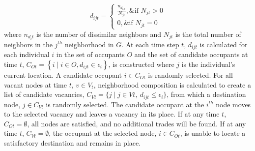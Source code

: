 \documentclass[a4paper]{article}
\begin{document}
\begin{equation}
    d_{ijt} = 
    \begin{cases} 
    \frac{n_{d_{i,t}}}{N_{jt}}, \& \text{if } N_{jt} > 0 \\
    0, \& \text{if } N_{jt} = 0 
    \end{cases}
\end{equation}
where $n_{d_it}$ is the number of dissimilar neighbors and $N_{jt}$ is the total number of neighbors in the $j^{th}$ neighborhood in $G$.  At each time step $t$, $d_{ijt}$ is calculated for each individual $i$ in the set of occupants $O$ and the set of candidate occupants at time $t$,  $C_{Ot} = \left\{ i \mid i \in O, d_{ijt} \in \epsilon_i \right\}
$, is constructed where $j$ is the individual’s current location. A candidate occupant $i\in C_{Ot}$ is randomly selected.  For all vacant nodes at time $t$, $v\in V_t$, neighborhood composition is calculated to create a list of candidate vacancies, $C_{Vt} = \{ j \mid j \in Vt, \ d_{ijt} \le \epsilon_i \}
$,  from which a destination node, $j\in C_{Vt}$ is randomly selected.   The candidate occupant at the $i^{th}$ node moves to the selected vacancy and leaves a vacancy in its place.  If at any time $t$, $C_{Ot}={\emptyset}$, all nodes are satisfied, and no additional trades will be found.  If at any time $t$, $C_{Vt}={\emptyset}$, the occupant at the selected node, $i\in C_{Ot}$, is unable to locate a satisfactory destination and remains in place.
\end{document}

